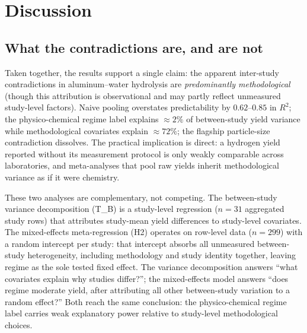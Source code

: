\section{Discussion}

\subsection{What the contradictions are, and are not}

Taken together, the results support a single claim: the apparent inter-study contradictions
in aluminum--water hydrolysis are \emph{predominantly methodological} (though this attribution is observational and
may partly reflect unmeasured study-level factors). Naive pooling
overstates predictability by $0.62$--$0.85$ in $R^2$; the physico-chemical regime label
explains $\approx\!2\%$ of between-study yield variance while methodological covariates
explain $\approx\!72\%$; the flagship particle-size contradiction dissolves. The practical
implication is direct: a hydrogen yield reported without its measurement protocol is only
weakly comparable across laboratories, and meta-analyses that pool raw yields inherit
methodological variance as if it were chemistry.

These two analyses are complementary, not competing. The between-study variance
decomposition (T\_B) is a study-level regression ($n\!=\!31$ aggregated study rows) that
attributes study-mean yield differences to study-level covariates. The mixed-effects
meta-regression (H2) operates on row-level data ($n\!=\!299$) with a random intercept
per study: that intercept absorbs all unmeasured between-study heterogeneity, including
methodology and study identity together, leaving regime as the sole tested fixed effect.
The variance decomposition answers ``what covariates explain why studies differ?''; the
mixed-effects model answers ``does regime moderate yield, after attributing all other
between-study variation to a random effect?'' Both reach the same conclusion: the
physico-chemical regime label carries weak explanatory power relative to study-level
methodological choices.

